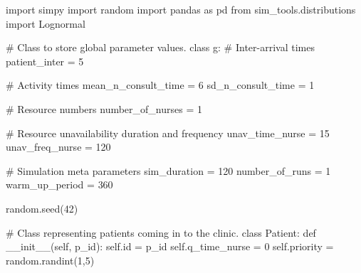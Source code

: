 \documentclass[
  letterpaper,
  DIV=11,
  numbers=noendperiod]{scrreprt}
\newenvironment{Shaded}{}{}
\newcommand{\BuiltInTok}[1]{\textcolor[rgb]{0.84,0.23,0.29}{#1}}
\newcommand{\CommentTok}[1]{\textcolor[rgb]{0.42,0.45,0.49}{#1}}
\newcommand{\DecValTok}[1]{\textcolor[rgb]{0.00,0.36,0.77}{#1}}
\newcommand{\FunctionTok}[1]{\textcolor[rgb]{0.44,0.26,0.76}{#1}}
\newcommand{\ImportTok}[1]{\textcolor[rgb]{0.01,0.18,0.38}{#1}}
\newcommand{\KeywordTok}[1]{\textcolor[rgb]{0.84,0.23,0.29}{#1}}
\newcommand{\NormalTok}[1]{\textcolor[rgb]{0.14,0.16,0.18}{#1}}
\newcommand{\OperatorTok}[1]{\textcolor[rgb]{0.14,0.16,0.18}{#1}}
\newcommand{\VariableTok}[1]{\textcolor[rgb]{0.89,0.38,0.04}{#1}}
\begin{document}
\begin{tcolorbox}[enhanced jigsaw, colframe=quarto-callout-note-color-frame, bottomtitle=1mm, breakable, rightrule=.15mm, coltitle=black, colbacktitle=quarto-callout-note-color!10!white, opacityback=0, leftrule=.75mm, arc=.35mm, toptitle=1mm, title=\textcolor{quarto-callout-note-color}{\faInfo}\hspace{0.5em}{Click here to view the full code}, titlerule=0mm, colback=white, toprule=.15mm, bottomrule=.15mm, left=2mm, opacitybacktitle=0.6]

\begin{Shaded}
\begin{Highlighting}[]
\ImportTok{import}\NormalTok{ simpy}
\ImportTok{import}\NormalTok{ random}
\ImportTok{import}\NormalTok{ pandas }\ImportTok{as}\NormalTok{ pd}
\ImportTok{from}\NormalTok{ sim\_tools.distributions }\ImportTok{import}\NormalTok{ Lognormal}


\CommentTok{\# Class to store global parameter values.}
\KeywordTok{class}\NormalTok{ g:}
    \CommentTok{\# Inter{-}arrival times}
\NormalTok{    patient\_inter }\OperatorTok{=} \DecValTok{5}

    \CommentTok{\# Activity times}
\NormalTok{    mean\_n\_consult\_time }\OperatorTok{=} \DecValTok{6}
\NormalTok{    sd\_n\_consult\_time }\OperatorTok{=} \DecValTok{1}

    \CommentTok{\# Resource numbers}
\NormalTok{    number\_of\_nurses }\OperatorTok{=} \DecValTok{1}

    \CommentTok{\# Resource unavailability duration and frequency}
\NormalTok{    unav\_time\_nurse }\OperatorTok{=} \DecValTok{15}
\NormalTok{    unav\_freq\_nurse }\OperatorTok{=} \DecValTok{120}

    \CommentTok{\# Simulation meta parameters}
\NormalTok{    sim\_duration }\OperatorTok{=} \DecValTok{120}
\NormalTok{    number\_of\_runs }\OperatorTok{=} \DecValTok{1}
\NormalTok{    warm\_up\_period }\OperatorTok{=} \DecValTok{360}

\NormalTok{    random.seed(}\DecValTok{42}\NormalTok{)}

\CommentTok{\# Class representing patients coming in to the clinic.}
\KeywordTok{class}\NormalTok{ Patient:}
    \KeywordTok{def} \FunctionTok{\_\_init\_\_}\NormalTok{(}\VariableTok{self}\NormalTok{, p\_id):}
        \VariableTok{self}\NormalTok{.}\BuiltInTok{id} \OperatorTok{=}\NormalTok{ p\_id}
        \VariableTok{self}\NormalTok{.q\_time\_nurse }\OperatorTok{=} \DecValTok{0}
        \VariableTok{self}\NormalTok{.priority }\OperatorTok{=}\NormalTok{ random.randint(}\DecValTok{1}\NormalTok{,}\DecValTok{5}\NormalTok{)}


\end{Highlighting}
\end{Shaded}
\end{tcolorbox}
\end{document}
